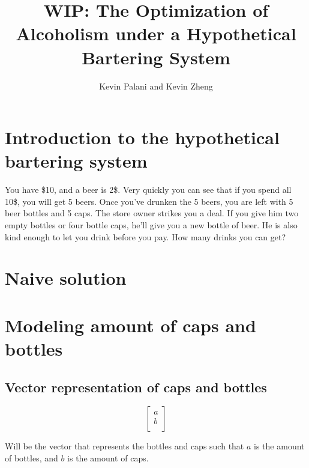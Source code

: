 \documentclass[letterpaper, 12pt]{article}
\title{WIP: The Optimization of Alcoholism under a Hypothetical Bartering System}
\author{Kevin Palani and Kevin Zheng}
\begin{document}
\maketitle
\tableofcontents
\section{Introduction to the hypothetical bartering system}
\par You have \$10, and a beer is 2\$.
Very quickly you can see that if you spend all 10\$, you will get 5 beers.
Once you've drunken the 5 beers, you are left with 5 beer bottles and 5 caps.
The store owner strikes you a deal.
If you give him two empty bottles or four bottle caps, he'll give you a new bottle of beer.
He is also kind enough to let you drink before you pay.
How many drinks you can get?
\section{Naive solution}

\section{Modeling amount of caps and bottles}
\subsection{Vector representation of caps and bottles}
\[
    \begin{bmatrix}
        a\\
        b\\
    \end{bmatrix}
\]
\par Will be the vector that represents the bottles and caps such that $a$ is the amount of bottles, and $b$ is the amount of caps.
\end{document}
